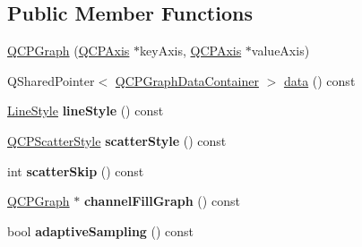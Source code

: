 \subsection*{Public Member Functions}
\begin{DoxyCompactItemize}
\item 
\hyperlink{classQCPGraph_a0393a38cf7183cbf46348eb6cf9a5a6c}{Q\+C\+P\+Graph} (\hyperlink{classQCPAxis}{Q\+C\+P\+Axis} $\ast$key\+Axis, \hyperlink{classQCPAxis}{Q\+C\+P\+Axis} $\ast$value\+Axis)
\item 
Q\+Shared\+Pointer$<$ \hyperlink{classQCPDataContainer}{Q\+C\+P\+Graph\+Data\+Container} $>$ \hyperlink{classQCPGraph_a04514a2b1fb61a280ead66abe80b89ab}{data} () const 
\item 
\hyperlink{classQCPGraph_ad60175cd9b5cac937c5ee685c32c0859}{Line\+Style} {\bfseries line\+Style} () const \hypertarget{classQCPGraph_ad6db8d31abeac256a285fc68d6b9b9be}{}\label{classQCPGraph_ad6db8d31abeac256a285fc68d6b9b9be}

\item 
\hyperlink{classQCPScatterStyle}{Q\+C\+P\+Scatter\+Style} {\bfseries scatter\+Style} () const \hypertarget{classQCPGraph_ae0227c79f4e42a350c2c99fb2fb879db}{}\label{classQCPGraph_ae0227c79f4e42a350c2c99fb2fb879db}

\item 
int {\bfseries scatter\+Skip} () const \hypertarget{classQCPGraph_ae82c8427471bf68ccae960dfea6f30bd}{}\label{classQCPGraph_ae82c8427471bf68ccae960dfea6f30bd}

\item 
\hyperlink{classQCPGraph}{Q\+C\+P\+Graph} $\ast$ {\bfseries channel\+Fill\+Graph} () const \hypertarget{classQCPGraph_a5369f23863e04a6164f8b66d49fd18f4}{}\label{classQCPGraph_a5369f23863e04a6164f8b66d49fd18f4}

\item 
bool {\bfseries adaptive\+Sampling} () const \hypertarget{classQCPGraph_ad3bea28ec910eedfa9b788928d610de0}{}\label{classQCPGraph_ad3bea28ec910eedfa9b788928d610de0}


\end{DoxyCompactItemize}
